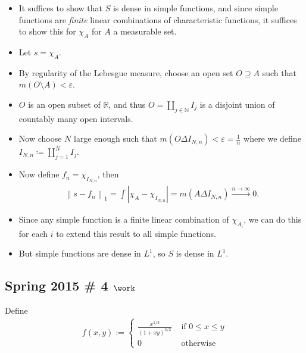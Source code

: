 \begin{solution}

\envlist

\begin{itemize}
\item
  It suffices to show that \(S\) is dense in simple functions, and since
  simple functions are \emph{finite} linear combinations of
  characteristic functions, it suffices to show this for \(\chi_A\) for
  \(A\) a measurable set.
\item
  Let \(s = \chi_{A}\).
\item
  By regularity of the Lebesgue measure, choose an open set
  \(O \supseteq A\) such that \(m(O\setminus A) < \varepsilon\).
\item
  \(O\) is an open subset of \({\mathbb{R}}\), and thus
  \(O = {\textstyle\coprod}_{j\in {\mathbb{N}}} I_j\) is a disjoint
  union of countably many open intervals.
\item
  Now choose \(N\) large enough such that
  \(m(O \Delta I_{N, n}) < \varepsilon = \frac 1 n\) where we define
  \(I_{N, n} \coloneqq{\textstyle\coprod}_{j=1}^N I_j\).
\item
  Now define \(f_n = \chi_{I_{N, n}}\), then
  \begin{align*}
  {\left\lVert {s - f_n} \right\rVert}_1 = \int {\left\lvert {\chi_A - \chi_{I_{N, n}}} \right\rvert} = m(A \Delta I_{N, n}) \overset{n\to\infty}\longrightarrow 0
  .\end{align*}
\item
  Since any simple function is a finite linear combination of
  \(\chi_{A_i}\), we can do this for each \(i\) to extend this result to
  all simple functions.
\item
  But simple functions are dense in \(L^1\), so \(S\) is dense in
  \(L^1\).
\end{itemize}

\end{solution}

\hypertarget{spring-2015-4-work}{%
\subsection{\texorpdfstring{Spring 2015 \# 4
\(\work\)}{Spring 2015 \# 4 \textbackslash work}}\label{spring-2015-4-work}}

Define
\begin{align*}
f(x, y):=\left\{\begin{array}{ll}{\frac{x^{1 / 3}}{(1+x y)^{3 / 2}}} & {\text { if } 0 \leq x \leq y} \\ {0} & {\text { otherwise }}\end{array}\right.
\end{align*}

